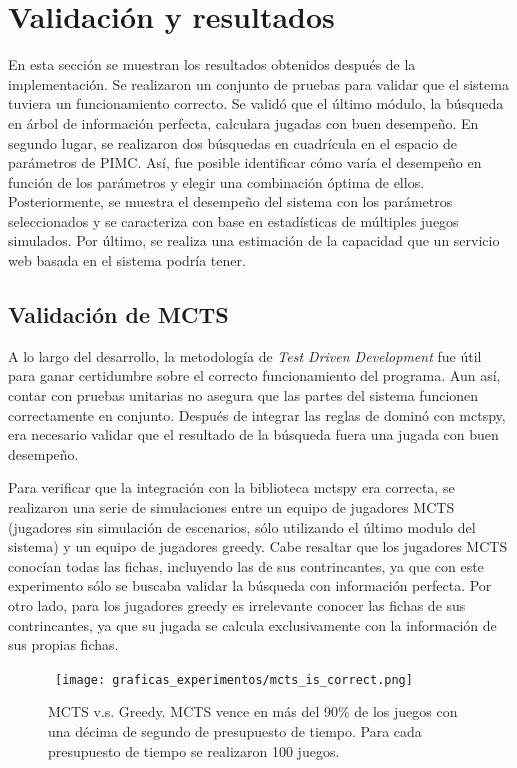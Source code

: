 \chapter{Validación y resultados}

\noindent
En esta sección se muestran los resultados obtenidos después de la
implementación. Se realizaron un conjunto de pruebas para validar que el sistema
tuviera un funcionamiento correcto. Se validó que el último módulo, la búsqueda
en árbol de información perfecta, calculara jugadas con buen desempeño. En
segundo lugar, se realizaron dos búsquedas en cuadrícula en el espacio de
parámetros de PIMC. Así, fue posible identificar cómo varía el desempeño en
función de los parámetros y elegir una combinación óptima de ellos.
Posteriormente, se muestra el desempeño del sistema con los parámetros
seleccionados y se caracteriza con base en estadísticas de múltiples juegos
simulados. Por último, se realiza una estimación de la capacidad que un servicio
web basada en el sistema podría tener.

\section{Validación de MCTS}

A lo largo del desarrollo, la metodología de  \textit{Test Driven Development}
fue útil para ganar certidumbre sobre el correcto funcionamiento del programa.
Aun así, contar con pruebas unitarias no asegura que las partes del sistema
funcionen correctamente en conjunto. Después de integrar las reglas de dominó
con mctspy, era necesario validar que el resultado de la búsqueda fuera una jugada
con buen desempeño.

Para verificar que la integración con la biblioteca mctspy era correcta, se
realizaron una serie de simulaciones entre un equipo de jugadores MCTS
(jugadores sin simulación de escenarios, sólo utilizando el último modulo del
sistema) y un equipo de jugadores greedy. Cabe resaltar que los jugadores MCTS
conocían todas las fichas, incluyendo las de sus contrincantes, ya que con este
experimento sólo se buscaba validar la búsqueda con información perfecta. Por
otro lado, para los jugadores greedy es irrelevante conocer las fichas de sus
contrincantes, ya que su jugada se calcula exclusivamente con la información de
sus propias fichas.

\begin{figure}[H]
    \begin{center}
        \hbox{\hspace{-2em}
            \texttt{[image: graficas\_experimentos/mcts\_is\_correct.png]}}
        \caption{MCTS v.s. Greedy. MCTS vence en más del 90\% de los juegos con
            una décima de segundo de presupuesto de tiempo. Para cada presupuesto de
            tiempo se realizaron 100 juegos.}
        \label{MGA}
    \end{center}
\end{figure}

